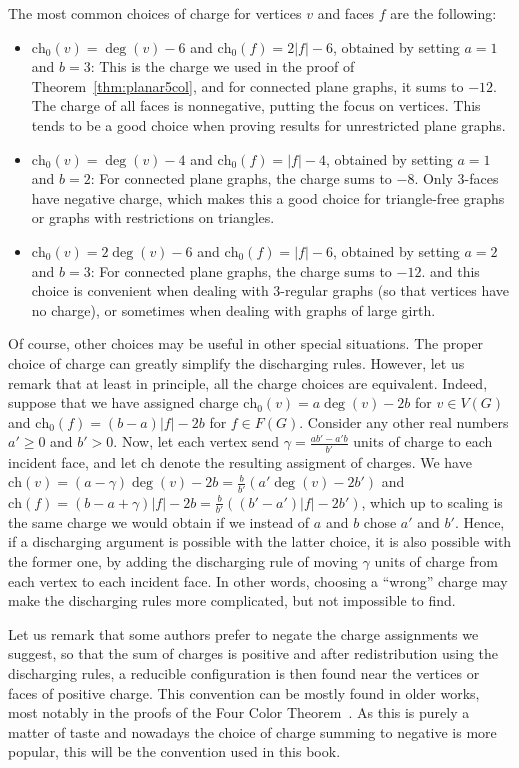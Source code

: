 \documentclass[12pt,twoside,openright,a4paper]{book}
\newcommand{\initch}{\text{ch}_0}
\newcommand{\finch}{\text{ch}}
\begin{document}
The most common choices of charge for vertices $v$ and faces $f$ are the following:
\begin{itemize}
\item $\initch(v)=\deg(v)-6$ and $\initch(f)=2|f|-6$, obtained by setting $a=1$ and $b=3$: This is the charge we used in the proof of Theorem~\ref{thm:planar5col},
and for connected plane graphs, it sums to $-12$.  The charge of all faces is nonnegative, putting the focus on vertices.  This tends to be a good
choice when proving results for unrestricted plane graphs.
\item $\initch(v)=\deg(v)-4$ and $\initch(f)=|f|-4$, obtained by setting $a=1$ and $b=2$: For connected plane graphs, the charge sums to $-8$.
Only $3$-faces have negative charge, which makes this a good choice for triangle-free graphs or graphs with restrictions on triangles.
\item $\initch(v)=2\deg(v)-6$ and $\initch(f)=|f|-6$, obtained by setting $a=2$ and $b=3$: For connected plane graphs, the charge sums to $-12$.
and this choice is convenient when dealing with $3$-regular graphs (so that vertices have no charge), or sometimes when dealing with graphs of large girth.
\end{itemize}
Of course, other choices may be useful in other special situations. The proper
choice of charge can greatly simplify the discharging rules.  However, let us
remark that at least in principle, all the charge choices are equivalent.
Indeed, suppose that we have assigned charge $\initch(v)=a\deg(v)-2b$ for $v\in V(G)$ and $\initch(f)=(b-a)|f|-2b$ for $f\in F(G)$.
Consider any other real numbers $a'\ge 0$ and $b'>0$.
Now, let each vertex send $\gamma=\frac{ab'-a'b}{b'}$ units of charge to each incident face, and let $\finch$ denote the resulting assigment of charges.
We have $\finch(v)=(a-\gamma)\deg(v)-2b=\frac{b}{b'}(a'\deg(v)-2b')$ and $\finch(f)=(b-a+\gamma)|f|-2b=\frac{b}{b'}((b'-a')|f|-2b')$,
which up to scaling is the same charge we would obtain if we instead of $a$ and $b$ chose $a'$ and $b'$.
Hence, if a discharging argument is possible with the latter choice, it is also possible with the former one, by adding the discharging rule of
moving $\gamma$ units of charge from each vertex to each incident face.
In other words, choosing a ``wrong'' charge may make the discharging rules more complicated, but not impossible to find.

Let us remark that some authors prefer to negate the charge assignments we suggest, so that the sum of charges is positive and
after redistribution using the discharging rules, a reducible configuration
is then found near the vertices or faces of positive charge.  This convention can be mostly found
in older works, most notably in the proofs of the Four Color Theorem~\cite{AppHak1,rsst}.  As this is purely a matter of taste
and nowadays the choice of charge summing to negative is more popular, this will be the convention used in this book.
\end{document}
